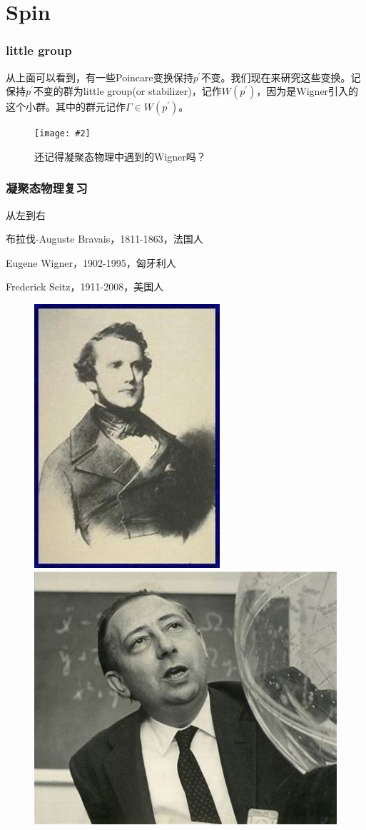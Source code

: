 \documentclass[CJK]{beamer}
\newcommand{\cpic}[2]{
\begin{center}
\texttt{[image: \#2]}
\end{center}
}
\newcommand{\cpicn}[3]
{
\begin{figure}[h!]
\cpic{#1}{#2}
\caption{#3\label{#2}}
\end{figure}
}
\begin{document}
\section{Spin}
\begin{frame}\frametitle{little group}
  \bch
  从上面可以看到，有一些Poincare变换保持$p^{\prime}$不变。我们现在来研究这些变换。记保持$p^{\prime}$不变的群为little group(or stabilizer)，记作$W(p^\prime)$，因为是Wigner引入的这个小群。其中的群元记作$\Gamma \in W(p^{\prime})$。
  \cpicn{0.25}{Wigner}{\bch 还记得凝聚态物理中遇到的Wigner吗？\ech}
  \ech
\end{frame}
\begin{frame}
\frametitle{\bch 凝聚态物理复习\ech}
\bch
从左到右\par
布拉伐-Auguste Bravais，1811-1863，法国人
\par
Eugene Wigner，1902-1995，匈牙利人
\par
Frederick Seitz，1911-2008，美国人
\begin{figure}
\includegraphics[scale=0.21]{bravais}
\includegraphics[scale=0.2]{wigner}

\end{figure}
\end{frame}
\end{document}
